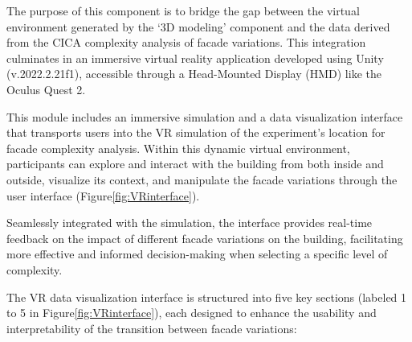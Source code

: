 

The purpose of this component is to bridge the gap between the virtual environment generated by the `3D modeling' component and the data derived from the CICA complexity analysis of facade variations.
This integration culminates in an immersive virtual reality application developed using Unity (v.2022.2.21f1), accessible through a Head-Mounted Display (HMD) like the Oculus Quest 2.

This module includes an immersive simulation and a data visualization interface that transports users into the VR simulation of the experiment's location for facade complexity analysis.
Within this dynamic virtual environment, participants can explore and interact with the building from both inside and outside, visualize its context, and manipulate the facade variations through the user interface (Figure\ref{fig:VRinterface}).

Seamlessly integrated with the simulation, the interface provides real-time feedback on the impact of different facade variations on the building, facilitating more effective and informed decision-making when selecting a specific level of complexity.


The VR data visualization interface is structured into five key sections (labeled 1 to 5 in Figure\ref{fig:VRinterface}), each designed to enhance the usability and interpretability of the transition between facade variations:

